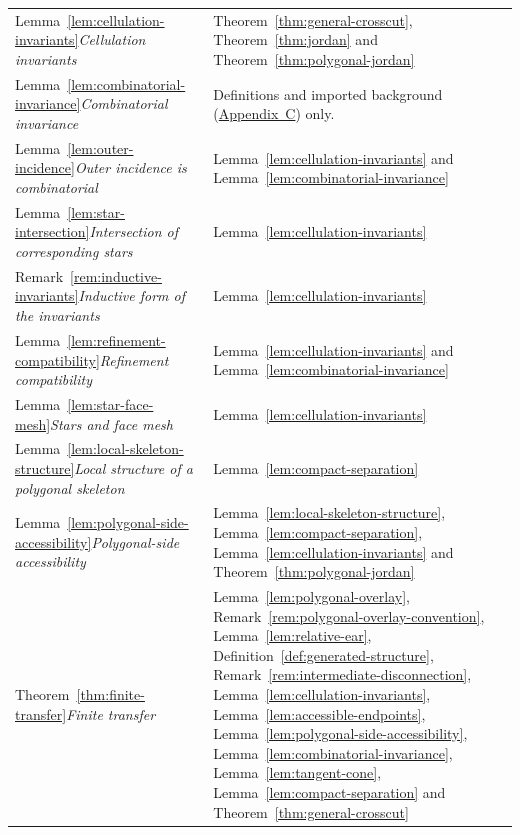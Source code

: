 \documentclass[11pt]{article}
\theoremstyle{mainplain}
\theoremstyle{mainroman}
\theoremstyle{definition}
\numberwithin{equation}{section}
\begin{document}
\begin{longtable}{@{}>{\raggedright\arraybackslash}p{}>{\raggedright\arraybackslash}p{}@{}}
Lemma~\ref{lem:cellulation-invariants}\newline\emph{Cellulation invariants} & Theorem~\ref{thm:general-crosscut}, Theorem~\ref{thm:jordan} and Theorem~\ref{thm:polygonal-jordan} \\
Lemma~\ref{lem:combinatorial-invariance}\newline\emph{Combinatorial invariance} & Definitions and imported background (\hyperref[app:background]{Appendix~C}) only. \\
Lemma~\ref{lem:outer-incidence}\newline\emph{Outer incidence is combinatorial} & Lemma~\ref{lem:cellulation-invariants} and Lemma~\ref{lem:combinatorial-invariance} \\
Lemma~\ref{lem:star-intersection}\newline\emph{Intersection of corresponding stars} & Lemma~\ref{lem:cellulation-invariants} \\
Remark~\ref{rem:inductive-invariants}\newline\emph{Inductive form of the invariants} & Lemma~\ref{lem:cellulation-invariants} \\
Lemma~\ref{lem:refinement-compatibility}\newline\emph{Refinement compatibility} & Lemma~\ref{lem:cellulation-invariants} and Lemma~\ref{lem:combinatorial-invariance} \\
Lemma~\ref{lem:star-face-mesh}\newline\emph{Stars and face mesh} & Lemma~\ref{lem:cellulation-invariants} \\
Lemma~\ref{lem:local-skeleton-structure}\newline\emph{Local structure of a polygonal skeleton} & Lemma~\ref{lem:compact-separation} \\
Lemma~\ref{lem:polygonal-side-accessibility}\newline\emph{Polygonal-side accessibility} & Lemma~\ref{lem:local-skeleton-structure}, Lemma~\ref{lem:compact-separation}, Lemma~\ref{lem:cellulation-invariants} and Theorem~\ref{thm:polygonal-jordan} \\
Theorem~\ref{thm:finite-transfer}\newline\emph{Finite transfer} & Lemma~\ref{lem:polygonal-overlay}, Remark~\ref{rem:polygonal-overlay-convention}, Lemma~\ref{lem:relative-ear}, Definition~\ref{def:generated-structure}, Remark~\ref{rem:intermediate-disconnection}, Lemma~\ref{lem:cellulation-invariants}, Lemma~\ref{lem:accessible-endpoints}, Lemma~\ref{lem:polygonal-side-accessibility}, Lemma~\ref{lem:combinatorial-invariance}, Lemma~\ref{lem:tangent-cone}, Lemma~\ref{lem:compact-separation} and Theorem~\ref{thm:general-crosscut} \\

\end{longtable}
\end{document}
